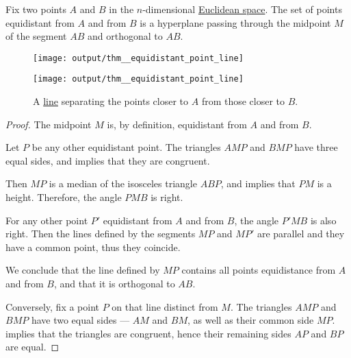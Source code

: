 \begin{proposition}\label{thm:equidistant_point_line}
  Fix two points \( A \) and \( B \) in the \( n \)-dimensional \hyperref[def:euclidean_space]{Euclidean space}. The set of points equidistant from \( A \) and from \( B \) is a hyperplane passing through the midpoint \( M \) of the segment \( AB \) and orthogonal to \( AB \).

  \begin{figure}[!ht]
    \begin{subcaptionblock}[t]{0.45\linewidth}
      \centering
      \texttt{[image: output/thm\_\_equidistant\_point\_line]}
    \end{subcaptionblock}
    \hfill
    \begin{subcaptionblock}[t]{0.45\linewidth}
      \centering
      \texttt{[image: output/thm\_\_equidistant\_point\_line]}
    \end{subcaptionblock}
    \caption{A \hyperref[def:affine_hyperplane]{line} separating the points closer to \( A \) from those closer to \( B \).}\label{fig:thm:equidistant_point_line}
  \end{figure}
\end{proposition}
\begin{proof}
  The midpoint \( M \) is, by definition, equidistant from \( A \) and from \( B \).

  Let \( P \) be any other equidistant point. The triangles \( AMP \) and \( BMP \) have three equal sides, and  implies that they are congruent.

  Then \( MP \) is a median of the isosceles triangle \( ABP \), and  implies that \( PM \) is a height. Therefore, the angle \( PMB \) is right.

  For any other point \( P' \) equidistant from \( A \) and from \( B \), the angle \( P'MB \) is also right. Then the lines defined by the segments \( MP \) and \( MP' \) are parallel and they have a common point, thus they coincide.

  We conclude that the line defined by \( MP \) contains all points equidistance from \( A \) and from \( B \), and that it is orthogonal to \( AB \).

  Conversely, fix a point \( P \) on that line distinct from \( M \). The triangles \( AMP \) and \( BMP \) have two equal sides --- \( AM \) and \( BM \), as well as their common side \( MP \).  implies that the triangles are congruent, hence their remaining sides \( AP \) and \( BP \) are equal.
\end{proof}

